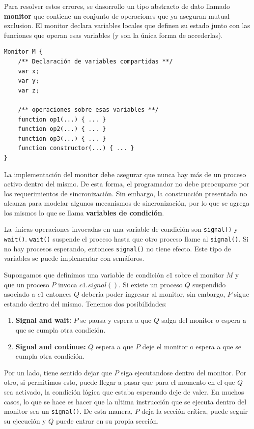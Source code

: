 Para resolver estos errores, se dasorrollo un tipo abstracto de dato llamado \textbf{monitor} que contiene un conjunto de operaciones que ya aseguran mutual exclusion. El monitor declara variables locales que definen su estado junto con las funciones que operan esas variables (y son la única forma de accederlas).

\begin{verbatim}
Monitor M {
	/** Declaración de variables compartidas **/
	var x;
	var y;
	var z;
	
	/** operaciones sobre esas variables **/
	function op1(...) { ... }
	function op2(...) { ... }
	function op3(...) { ... }
	function constructor(...) { ... }
}
\end{verbatim}

La implementación del monitor debe asegurar que nunca hay más de un proceso activo dentro del mismo. De esta forma, el programador no debe preocuparse por los requerimientos de sincronización. Sin embargo, la construcción presentada no alcanza para modelar algunos mecanismos de sincronización, por lo que se agrega los mismos lo que se llama \textbf{variables de condición}.

La únicas operaciones invocadas en una variable de condición son \texttt{signal()} y \texttt{wait()}. \texttt{wait()} suspende el proceso hasta que otro proceso llame al \texttt{signal()}. Si no hay procesos esperando, entonces \texttt{signal()} no tiene efecto. Este tipo de variables se puede implementar con semáforos. 

Supongamos que definimos una variable de condición $c1$ sobre el monitor $M$ y que un proceso $P$ invoca $c1.signal()$. Si existe un proceso $Q$ suspendido asociado a $c1$ entonces $Q$ debería poder ingresar al monitor, sin embargo, $P$ sigue estando dentro del mismo. Tenemos dos posibilidades:

\begin{enumerate}
	\item \textbf{Signal and wait:} $P$ se pausa y espera a que $Q$ salga del monitor o espera a que se cumpla otra condición.
	\item \textbf{Signal and continue:} $Q$ espera a que $P$ deje el monitor o espera a que se cumpla otra condición.
\end{enumerate}

Por un lado, tiene sentido dejar que $P$ siga ejecutandose dentro del monitor. Por otro, si permitimos esto, puede llegar a pasar que para el momento en el que $Q$ sea activado, la condición lógica que estaba esperando deje de valer. En muchos casos, lo que se hace es hacer que la ultima instrucción que se ejecuta dentro del monitor sea un \texttt{signal()}. De esta manera, $P$ deja la sección crítica, puede seguir su ejecución y $Q$ puede entrar en su propia sección.

